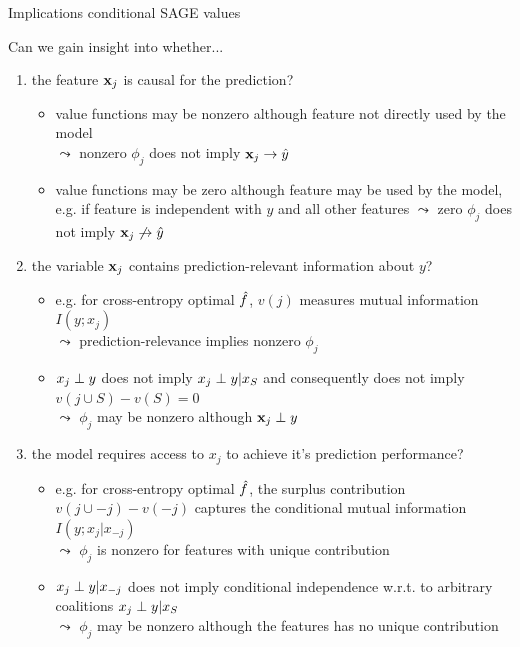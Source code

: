 \documentclass[11pt,compress,t,notes=noshow, aspectratio=169, xcolor=table]{beamer}
\begin{document}
\begin{frame}{Implications conditional SAGE values}

Can we gain insight into whether...

\begin{enumerate}
    \item<1> the feature $\xj$ is causal for the prediction?
    \begin{itemize}
      \item value functions may be nonzero although feature not directly used by the model\\
      $\leadsto$ nonzero $\phi_j$ does not imply $\xj \rightarrow \hat{y}$
      \item value functions may be zero although feature may be used by the model, e.g. if feature is independent with $y$ and all other features $\leadsto$ zero $\phi_j$ does not imply $\xj \not \rightarrow \hat{y}$
    \end{itemize}
    \item<2> the variable $\xj$ contains prediction-relevant information about $y$?
    \begin{itemize}
      \item e.g. for cross-entropy optimal $\fh$, $v(j)$ measures mutual information $I(y;x_j)$\\
      $\leadsto$ prediction-relevance implies nonzero $\phi_j$
      \item $x_j \indep y$ does not imply $x_j \indep y | x_S$ and consequently does not imply $v(j \cup S) - v(S) = 0$\\
      $\leadsto$ $\phi_j$ may be nonzero although $\xj \indep y$
    \end{itemize}
    \item<3> the model requires access to $x_j$ to achieve it's prediction performance?  
    \begin{itemize}
        \item e.g. for cross-entropy optimal $\fh$, the surplus contribution $v(j \cup -j) - v(-j)$ captures the conditional mutual information $I(y;x_j|x_{-j})$\\
        $\leadsto$ $\phi_j$ is nonzero for features with unique contribution
        \item $x_j \indep y | x_{-j}$ does not imply conditional independence w.r.t. to arbitrary coalitions $x_j \indep y | x_S$\\
        $\leadsto$ $\phi_j$ may be nonzero although the features has no unique contribution
    \end{itemize}
\end{enumerate}

\end{frame}
\end{document}
